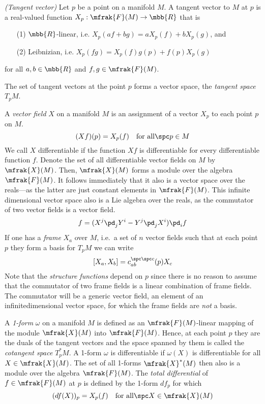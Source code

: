 \documentclass[10pt,reqno]{amsart}
\numberwithin{equation}{section}
\begin{document}
\begin{definition}\emph{(Tangent vector)}
	Let $p$ be a point on a manifold $M$. A tangent vector to $M$ 
	at $p$ is a real-valued function $X_p : \mfrak{F}(M) 
	\rightarrow \mbb{R}$ that is
	\begin{itemize}
		\item[(1)] $\mbb{R}$-linear, i.e. $X_p(af+bg) = aX_p(f) + 
			bX_p(g)$, and
		\item[(2)] Leibnizian, i.e. $X_p(fg) = X_p(f)g(p) + 
			f(p)X_p(g)$
	\end{itemize}
	for all $a,b \in \mbb{R}$ and $f,g \in \mfrak{F}(M)$.
\end{definition}
The set of tangent vectors at the point $p$ forms a vector space, 
the \emph{tangent space} $T_p M$.

\blankline
A \emph{vector field} $X$ on a manifold $M$ is an assignment of a 
vector $X_p$ to each point $p$ on $M$.
\begin{equation}
	(Xf)(p) = X_p(f) \quad \text{for all}\spc p \in M
\end{equation}
We call $X$ differentiable if the function $Xf$ is differentiable 
for every differentiable function $f$. Denote the set of all 
differentiable vector fields on $M$ by $\mfrak{X}(M)$. Then, 
$\mfrak{X}(M)$ forms a module over the algebra $\mfrak{F}(M)$. It 
follows immediately that it also is a vector space over the 
reals---as the latter are just constant elements in 
$\mfrak{F}(M)$. This infinite dimensional vector space also is a 
Lie algebra over the reals, as the commutator of two vector 
fields is a vector field.
%
\begin{equation}
	[X,Y]f = (X^j \pd_j Y^i - Y^j \pd_j X^i) \pd_i f
\end{equation}
%
If one has a \emph{frame} $X_a$ over $M$, i.e.\ a set of $n$ 
vector fields such that at each point $p$ they form a basis for 
$T_p M$ we can write
%
\begin{equation}\label{eq:GenStrucEqs}
	[X_a,X_b] = c_{ab}^{\spc\spc c}(p) X_c
\end{equation}
%
Note that the \emph{structure functions} depend on $p$ since 
there is no reason to assume that the commutator of two frame 
fields is a linear combination of frame fields. The commutator 
will be a generic vector field, an element of an 
infinitedimensional vector space, for which the frame fields are 
\emph{not} a basis.

\blankline
A \emph{1-form} $\omega$ on a manifold $M$ is defined as an 
$\mfrak{F}(M)$-linear mapping of the module $\mfrak{X}(M)$ into 
$\mfrak{F}(M)$.
Hence, at each point $p$ they are the duals of the tangent 
vectors and the space spanned by them is called the 
\emph{cotangent space} $T^\ast_p M$. A 1-form $\omega$ is 
differentiable if $\omega(X)$ is differentiable for all $X \in 
\mfrak{X}(M)$. The set of all 1-forms $\mfrak{X}^\ast(M)$ then 
also is a module over the algebra $\mfrak{F}(M)$. The \emph{total 
	differential} of $f \in \mfrak{F}(M)$ at $p$ is defined by the 
1-form $df_p$ for which
\begin{equation}
	(df(X))_p = X_p(f) \quad \text{for all}\spc X \in \mfrak{X}(M)
\end{equation}
%
\end{document}
